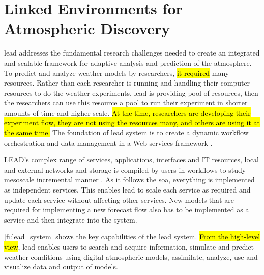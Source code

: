 \section{Linked Environments for Atmospheric Discovery}
\label{se:lead}

\acrfull{lead} \cite{Droegemeier2005Service-OrientedWeather} addresses the fundamental research challenges needed to create an integrated and scalable framework for adaptive analysis and prediction of the atmosphere. To predict and analyze weather models by researchers, \hl{it required} many resources. Rather than each researcher is running and handling their computer resources to do the weather experiments, \acrshort{lead} is providing pool of resources, then the researchers can use this resource a pool to run their experiment in shorter amounts of time and higher scale. \hl{At the time, researchers are developing their experiment flow, they are not using the resources many, and others are using it at the same time.} The foundation of \acrshort{lead} system is to create a dynamic workflow orchestration and data management in a Web services framework \cite{Droegemeier2005Service-OrientedWeather}.

LEAD's complex range of services, applications, interfaces and IT resources, local and external networks and storage is compiled by users in workflows to study mesoscale incremental manner \cite{Droegemeier2005Service-OrientedWeather}. As it follows the \acrshort{soa}, everything is implemented as independent services. This enables \acrshort{lead} to scale each service as required and update each service without affecting other services. New models that are required for implementing a new forecast flow also has to be implemented as a service and then integrate into the system.

\cref{fi:lead_system} shows the key capabilities of the \acrshort{lead} system. \hl{From the high-level view}, \acrshort{lead} enables users to search and acquire information, simulate and predict weather conditions using digital atmospheric models, assimilate, analyze, use and visualize data and output of models.

